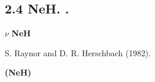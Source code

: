 \documentclass[a4paper]{article}
\begin{document}
\subsection[2.4 {\CYRZ}{\cyrn}{\cyra}{\cyrch}{\cyre}{\cyrn}{\cyri}{\cyrya} {\cyrs}{\cyri}{\cyrl}
{\cyro}{\cyrs}{\cyrc}{\cyri}{\cyrl}{\cyrl}{\cyrya}{\cyrt}{\cyro}{\cyrr}{\cyro}{\cyrv} {\cyrd}{\cyrl}{\cyrya}
{\cyrm}{\cyro}{\cyrl}{\cyre}{\cyrk}{\cyru}{\cyrl}{\cyrery} NeH.
{\CYRZ}{\cyra}{\cyrp}{\cyrr}{\cyre}{\cyrshch}{\cyre}{\cyrn}{\cyrn}{\cyrery}{\cyre}
{\cyrp}{\cyre}{\cyrr}{\cyre}{\cyrh}{\cyro}{\cyrd}{\cyrery}.]{2.4
{\CYRZ}{\cyrn}{\cyra}{\cyrch}{\cyre}{\cyrn}{\cyri}{\cyrya} {\cyrs}{\cyri}{\cyrl}
{\cyro}{\cyrs}{\cyrc}{\cyri}{\cyrl}{\cyrl}{\cyrya}{\cyrt}{\cyro}{\cyrr}{\cyro}{\cyrv} {\cyrd}{\cyrl}{\cyrya}
{\cyrm}{\cyro}{\cyrl}{\cyre}{\cyrk}{\cyru}{\cyrl}{\cyrery} \foreignlanguage{english}{NeH}.
{\CYRZ}{\cyra}{\cyrp}{\cyrr}{\cyre}{\cyrshch}{\cyre}{\cyrn}{\cyrn}{\cyrery}{\cyre}
{\cyrp}{\cyre}{\cyrr}{\cyre}{\cyrh}{\cyro}{\cyrd}{\cyrery}.}
\hypertarget{RefHeading4705463868395}{}{\centering
\textbf{{\CYRZ}{\cyra}{\cyrv}{\cyri}{\cyrs}{\cyri}{\cyrm}{\cyro}{\cyrs}{\cyrt}{\cyrsftsn}
{\cyrk}{\cyrv}{\cyra}{\cyrn}{\cyrt}{\cyro}{\cyrv}{\cyro}{\cyrg}{\cyro}
{\cyrd}{\cyre}{\cyrf}{\cyre}{\cyrk}{\cyrt}{\cyra} {\cyro}{\cyrt} }\foreignlanguage{english}{\textbf{$\nu $}}\textbf{
{\cyrd}{\cyrl}{\cyrya} }\foreignlanguage{english}{\textbf{NeH}}\textbf{ }
\par}

{\CYRK}{\cyrv}{\cyra}{\cyrn}{\cyrt}{\cyro}{\cyrv}{\cyrery}{\cyre} {\cyrd}{\cyre}{\cyrf}{\cyre}{\cyrk}{\cyrt}{\cyrery}
{\cyrp}{\cyrr}{\cyri}{\cyrv}{\cyre}{\cyrd}{\cyre}{\cyrn}{\cyrery} {\cyrp}{\cyro}
{\cyrs}{\cyrt}{\cyra}{\cyrt}{\cyrsftsn}{\cyre} \foreignlanguage{english}{S}. \foreignlanguage{english}{Raynor}
\foreignlanguage{english}{and} \foreignlanguage{english}{D}. \foreignlanguage{english}{R}.
\foreignlanguage{english}{Herschbach} (1982).


\bigskip

{\centering
\textbf{{\CYRS}{\cyri}{\cyrl}{\cyrery}
{\cyro}{\cyrs}{\cyrc}{\cyri}{\cyrl}{\cyrl}{\cyrya}{\cyrt}{\cyro}{\cyrr}{\cyro}{\cyrv}
(}\foreignlanguage{english}{\textbf{NeH}}\textbf{)}
\par}
\end{document}
